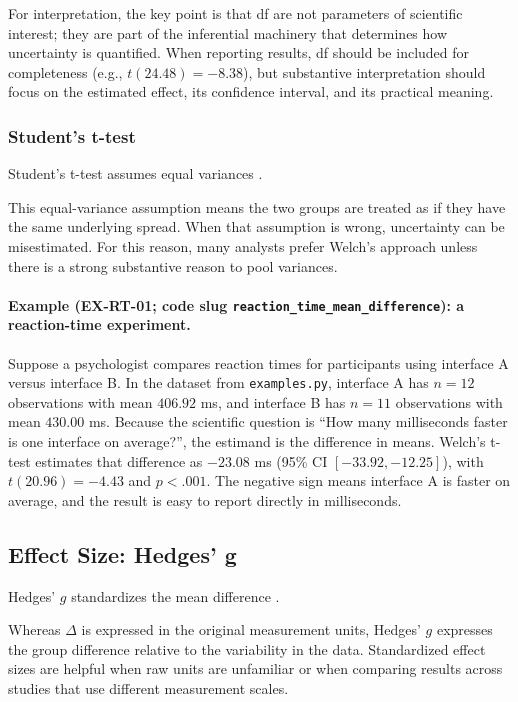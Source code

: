 \documentclass[11pt]{article}
\begin{document}
For interpretation, the key point is that df are not parameters of scientific interest; they are part of the inferential machinery that determines how uncertainty is quantified. When reporting results, df should be included for completeness (e.g., $t(24.48) = -8.38$), but substantive interpretation should focus on the estimated effect, its confidence interval, and its practical meaning.

\subsubsection{Student's t-test}

Student's t-test assumes equal variances \citep{student1908probable}.

This equal-variance assumption means the two groups are treated as if they have the same underlying spread. When that assumption is wrong, uncertainty can be misestimated. For this reason, many analysts prefer Welch's approach unless there is a strong substantive reason to pool variances.

\paragraph{Example (EX-RT-01; code slug \texttt{reaction\_time\_mean\_difference}): a reaction-time experiment.}
Suppose a psychologist compares reaction times for participants using interface A versus interface B. In the dataset from \verb|examples.py|, interface A has $n = 12$ observations with mean $406.92$ ms, and interface B has $n = 11$ observations with mean $430.00$ ms. Because the scientific question is ``How many milliseconds faster is one interface on average?'', the estimand is the difference in means. Welch's t-test estimates that difference as $-23.08$ ms (95\% CI $[-33.92, -12.25]$), with $t(20.96) = -4.43$ and $p < .001$. The negative sign means interface A is faster on average, and the result is easy to report directly in milliseconds.

\subsection{Effect Size: Hedges' g}

Hedges' $g$ standardizes the mean difference \citep{hedges1981distribution}.

Whereas $\Delta$ is expressed in the original measurement units, Hedges' $g$ expresses the group difference relative to the variability in the data. Standardized effect sizes are helpful when raw units are unfamiliar or when comparing results across studies that use different measurement scales.
\end{document}
